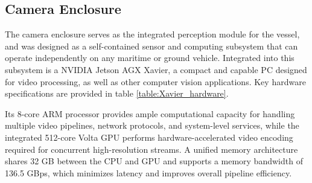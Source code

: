\documentclass{erauthesis}
\begin{document}
\subsection{Camera Enclosure} \label{comp:camera_enclosure}





The camera enclosure serves as the integrated perception module for the vessel, and was designed as a self-contained sensor and computing subsystem that can operate independently on any maritime or ground vehicle. 
Integrated into this subsystem is a NVIDIA Jetson AGX Xavier, a compact and capable PC designed for video processing, as well as other computer vision applications.
Key hardware specifications are provided in table \ref{table:Xavier_hardware}.

Its 8-core ARM processor provides ample computational capacity for handling multiple video pipelines, network protocols, and system-level services, while the integrated 512-core Volta GPU performs hardware-accelerated video encoding required for concurrent high-resolution streams.  
A unified memory architecture shares 32 GB between the CPU and GPU and supports a memory bandwidth of 136.5 GBps, which minimizes latency and improves overall pipeline efficiency.
\end{document}
